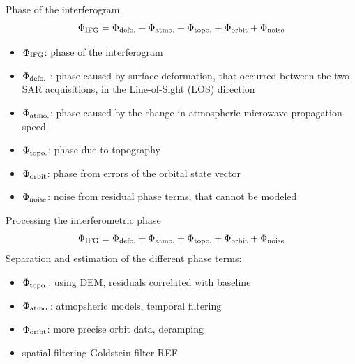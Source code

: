 \documentclass{beamer}
\begin{document}
\begin{frame}{Phase of the interferogram}
    \[
        \Phi_{\text{IFG}} = \Phi_{\text{defo.}} + \Phi_{\text{atmo.}} + \Phi_{\text{topo.}} + \Phi_{\text{orbit}} + \Phi_{\text{noise}}
    \]
    \begin{itemize}
        \item $\Phi_{\text{IFG}}$: phase of the interferogram 
        \item $\Phi_{\text{defo.}}$ : phase caused by surface deformation, that occurred between the two SAR acquisitions, in the Line-of-Sight (LOS) direction
        \item $\Phi_{\text{atmo.}}$: phase caused by the change in atmospheric microwave propagation speed
        \item $\Phi_{\text{topo.}}$: phase due to topography
        \item $\Phi_{\text{orbit}}$: phase from errors of the orbital state vector
        \item $\Phi_{\text{noise}}$: noise from residual phase terms, that cannot be modeled
    \end{itemize}    
\end{frame}


\begin{frame}{Processing the interferometric phase}
    \[
        \Phi_{\text{IFG}} = \Phi_{\text{defo.}} + \Phi_{\text{atmo.}} + \Phi_{\text{topo.}} + \Phi_{\text{orbit}} + \Phi_{\text{noise}}
    \]
    Separation and estimation of the different phase terms:
    \begin{itemize}
        \item $\Phi_{\text{topo.}}$: using DEM, residuals correlated with baseline
        \item $\Phi_{\text{atmo.}}$: atmopsheric models, temporal filtering
        \item $\Phi_{\text{oribt}}$: more precise orbit data, deramping
        \item spatial filtering Goldstein-filter REF
    \end{itemize}
\end{frame}
\end{document}

